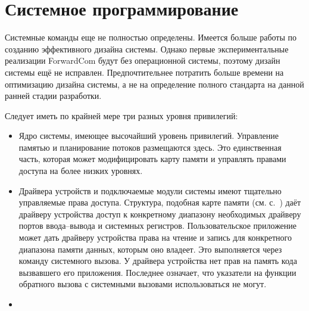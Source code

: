 \documentclass[forwardcom.tex]{subfiles}
\begin{document}
\chapter{Системное программирование}
Системные команды еще не полностью определены. Имеется больше работы по созданию эффективного дизайна системы. Однако первые экспериментальные реализации ForwardCom будут без операционной системы, поэтому дизайн системы ещё не исправлен. Предпочтительнее потратить больше времени на оптимизацию дизайна системы, а не на определение полного стандарта на данной ранней стадии разработки.

Следует иметь по крайней мере три разных уровня привилегий:
\begin{itemize}
\item  Ядро системы, имеющее высочайший уровень привилегий. Управление памятью и планирование потоков размещаются здесь. Это единственная часть, которая может модифицировать карту памяти и управлять правами доступа на более низких уровнях.

\item Драйвера устройств и подключаемые модули системы имеют тщательно управляемые права доступа. Структура, подобная карте памяти (см. с.~\pageref{memoryManagement}) даёт драйверу устройства доступ к конкретному диапазону необходимых драйверу портов ввода--вывода и системных регистров. Пользовательское приложение может дать драйверу устройства права на чтение и запись для конкретного диапазона памяти данных, которым оно владеет. Это выполняется через команду системного вызова. У драйвера устройства нет прав на память кода вызвавшего его приложения. Последнее означает, что указатели на функции обратного вызова с системными вызовами использоваться не могут.

\item
\end{itemize}
%
%
\end{document}
